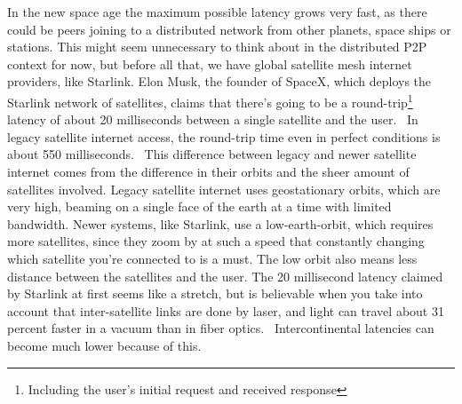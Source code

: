 In the new space age the maximum possible latency grows very fast, as there could be peers joining to a distributed network from other planets, space ships or stations. This might seem unnecessary to think about in the distributed P2P context for now, but before all that, we have global satellite mesh internet providers, like Starlink. Elon Musk, the founder of SpaceX, which deploys the Starlink network of satellites, claims that there's going to be a round-trip\footnote{Including the user's initial request and received response} latency of about 20 milliseconds between a single satellite and the user.~\cite{Tung_undated-ny} In legacy satellite internet access, the round-trip time even in perfect conditions is about 550 milliseconds.~\cite{noauthor_undated-zc} This difference between legacy and newer satellite internet comes from the difference in their orbits and the sheer amount of satellites involved. Legacy satellite internet uses geostationary orbits, which are very high, beaming on a single face of the earth at a time with limited bandwidth. Newer systems, like Starlink, use a low-earth-orbit, which requires more satellites, since they zoom by at such a speed that constantly changing which satellite you're connected to is a must. The low orbit also means less distance between the satellites and the user. The 20 millisecond latency claimed by Starlink at first seems like a stretch, but is believable when you take into account that inter-satellite links are done by laser, and light can travel about 31 percent faster in a vacuum than in fiber optics.~\cite{Finley2013-wt} Intercontinental latencies can become much lower because of this.

